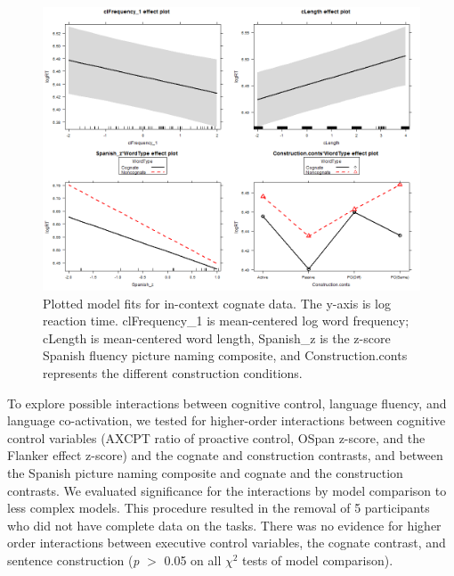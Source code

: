 \begin{figure}[htbp]
\centering
\includegraphics[width=\textwidth,height=\textheight,keepaspectratio]{Rplot34.png}
\caption{Plotted model fits for in-context cognate data. The y-axis is log reaction time. clFrequency\_1 is mean-centered log word frequency; cLength is mean-centered word length, Spanish\_z is the z-score Spanish fluency picture naming composite, and Construction.conts represents the different construction conditions.}
\label{fig:Rplot34}
\end{figure}


To explore possible interactions between cognitive control, language fluency, and language co-activation, we tested for higher-order interactions between cognitive control variables (AXCPT ratio of proactive control, OSpan z-score, and the Flanker effect z-score) and the cognate and construction contrasts, and between the Spanish picture naming composite and cognate and the construction contrasts. We evaluated significance for the interactions by model comparison to less complex models. This procedure resulted in the removal of 5 participants who did not have complete data on the tasks. There was no evidence for higher order interactions between executive control variables, the cognate contrast, and sentence construction (\emph{p} $>$ 0.05 on all $\chi^2$ tests of model comparison).

